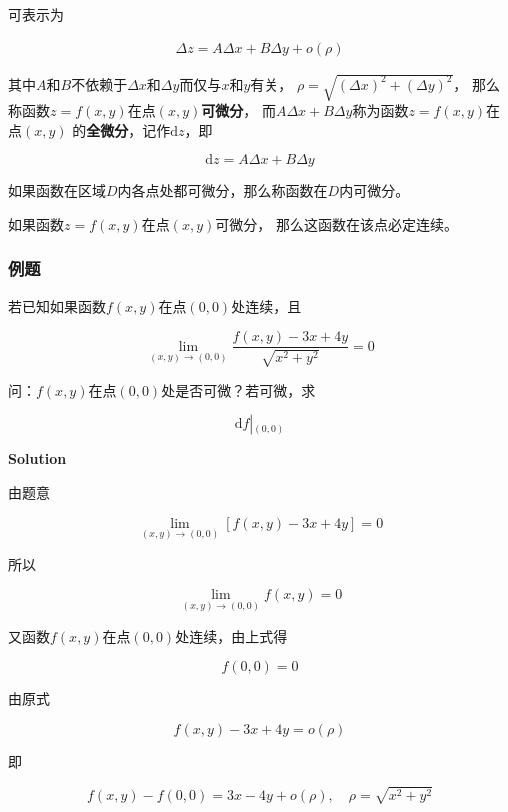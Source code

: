 \documentclass[12pt, a4paper]{article}
\numberwithin{equation}{section}
\newcommand{\rmd}{\mathrm{d}}
\begin{document}
    可表示为

    \begin{align}
        \Delta z=A \Delta x+B \Delta y+o(\rho)
    \end{align}

    其中\(A\)和\(B\)不依赖于\(\Delta x\)和\(\Delta y\)而仅与\(x\)和\(y\)有关，
    \(\rho = \sqrt{\left(\Delta x\right)^2+\left(\Delta y\right)^2}\)，
    那么称函数\(z=f\left(x,y\right)\)在点\(\left(x, y\right)\)\textbf{可微分}，
    而\(A\Delta x + B\Delta y\)称为函数\(z=f\left(x,y\right)\)在点\(\left(x, y\right)\)
    的\textbf{全微分}，记作\(\rmd z\)，即

    $$
        \mathrm{d} z=A \Delta x+B \Delta y
    $$

    如果函数在区域\(D\)内各点处都可微分，那么称函数在\(D\)内可微分。

    如果函数\(z=f\left(x,y\right)\)在点\(\left(x, y\right)\)可微分，
    那么这函数在该点必定连续。
    
\subsubsection{例题}

    若已知如果函数\(f\left(x,y\right)\)在点\(\left(0, 0\right)\)处连续，且

    $$
        \lim _{(x, y) \rightarrow(0,0)} \frac{f(x, y)-3 x+4 y}{\sqrt{x^2+y^2}}=0
    $$

    问：\(f\left(x,y\right)\)在点\(\left(0, 0\right)\)处是否可微？若可微，求

    $$
        \rmd f\left|_{\left(0,0\right)}\right.
    $$
    \vspace{1em}

    \textbf{Solution}
    \vspace{1em}

    由题意

    $$
        \lim _{(x, y) \rightarrow(0,0)}\left[f(x, y)-3 x+4 y\right]=0
    $$

    所以

    $$
        \lim _{(x, y) \rightarrow(0,0)} f(x, y)=0
    $$

    又函数\(f\left(x,y\right)\)在点\(\left(0, 0\right)\)处连续，由上式得

    $$
        f\left(0,0\right)=0
    $$

    由原式

    $$
        f(x, y)-3 x+4 y=o(\rho)
    $$

    即

    $$
        f\left(x,y\right) - f\left(0,0\right) = 3 x-4 y+o(\rho),\quad
        \rho = \sqrt{x^2+y^2}
    $$
\end{document}
